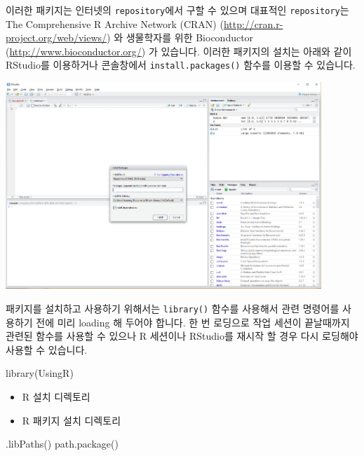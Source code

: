 \documentclass[
]{book}
\newenvironment{Shaded}{\begin{snugshade}}{\end{snugshade}}
\newcommand{\FunctionTok}[1]{\textcolor[rgb]{0.00,0.00,0.00}{#1}}
\newcommand{\NormalTok}[1]{#1}
\providecommand{\tightlist}{%
  \setlength{\itemsep}{0pt}\setlength{\parskip}{0pt}}
\begin{document}
이러한 패키지는 인터넷의 \texttt{repository}에서 구할 수 있으며 대표적인 \texttt{repository}는 The Comprehensive R Archive Network (CRAN) (\url{http://cran.r-project.org/web/views/}) 와 생물학자를 위한 Bioconductor (\url{http://www.bioconductor.org/}) 가 있습니다. 이러한 패키지의 설치는 아래와 같이 RStudio를 이용하거나 콘솔창에서 \texttt{install.packages()} 함수를 이용할 수 있습니다.

\includegraphics[width=4.6875in,height=\textheight]{images/01/01-18.PNG}

패키지를 설치하고 사용하기 위해서는 \texttt{library()} 함수를 사용해서 관련 명령어를 사용하기 전에 미리 loading 해 두어야 합니다. 한 번 로딩으로 작업 세션이 끝날때까지 관련된 함수를 사용할 수 있으나 R 세션이나 RStudio를 재시작 할 경우 다시 로딩해야 사용할 수 있습니다.

\begin{Shaded}
\begin{Highlighting}[]
\FunctionTok{library}\NormalTok{(UsingR)}
\end{Highlighting}
\end{Shaded}

\begin{itemize}
\tightlist
\item
  R 설치 디렉토리
\item
  R 패키지 설치 디렉토리
\end{itemize}

\begin{Shaded}
\begin{Highlighting}[]
\FunctionTok{.libPaths}\NormalTok{()}
\FunctionTok{path.package}\NormalTok{()}
\end{Highlighting}
\end{Shaded}
\end{document}
